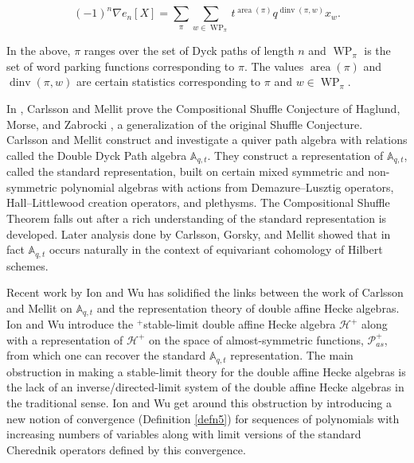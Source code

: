 \documentclass[ALCO,Unicode]{cedram}
\DeclareMathOperator{\WP}{WP}
\DeclareMathOperator{\area}{area}
\DeclareMathOperator{\dinv}{dinv}
\begin{document}
\begin{thm}

$$ (-1)^n \nabla e_n[X] = \sum_{\pi}\sum_{ w \in \WP_{\pi}} t^{\area(\pi)} q^{\dinv(\pi,w)} x_{w}. $$

\end{thm}

In the above, $\pi$ ranges over the set of Dyck paths of length $n$ and $\WP_{\pi}$ is the set of word parking functions corresponding to $\pi$. The values $\area(\pi)$ and $\dinv(\pi,w)$ are certain statistics corresponding to $\pi$ and $w \in \WP_{\pi}$.


In \cite{CM_2015}, Carlsson and Mellit prove the Compositional Shuffle Conjecture of Haglund, Morse, and Zabrocki \cite{HMZ}, a generalization of the original Shuffle Conjecture. Carlsson and Mellit construct and investigate a quiver path algebra with relations called the Double Dyck Path algebra $\mathbb{A}_{q,t}$. They construct a representation of $\mathbb{A}_{q,t}$, called the standard representation, built on certain mixed symmetric and non-symmetric polynomial algebras with actions from Demazure--Lusztig operators, Hall--Littlewood creation operators, and plethysms. The Compositional Shuffle Theorem 
falls out after a rich understanding of the standard representation is developed. Later analysis done by Carlsson, Gorsky, and Mellit \cite{GCM_2017} showed that in fact $\mathbb{A}_{q,t}$ occurs naturally in the context of equivariant cohomology of Hilbert schemes. 

Recent work by Ion and Wu \cite{Ion_2022} has solidified the links between the work of Carlsson and Mellit on $\mathbb{A}_{q,t}$ and the representation theory of double affine Hecke algebras. Ion and Wu introduce the $^+$stable-limit double affine Hecke algebra $\mathscr{H}^{+}$ along with a representation of $\mathscr{H}^{+}$ on the space of almost-symmetric functions, $\mathscr{P}_{as}^{+}$, from which one can recover the standard $\mathbb{A}_{q,t}$ representation. The main obstruction in making a stable-limit theory for the double affine Hecke algebras is the lack of an inverse/directed-limit system of the double affine Hecke algebras in the traditional sense. Ion and Wu get around this obstruction by introducing a new notion of convergence (Definition \ref{defn5}) for sequences of polynomials with increasing numbers of variables along with limit versions of the standard Cherednik operators defined by this convergence. 
\end{document}
